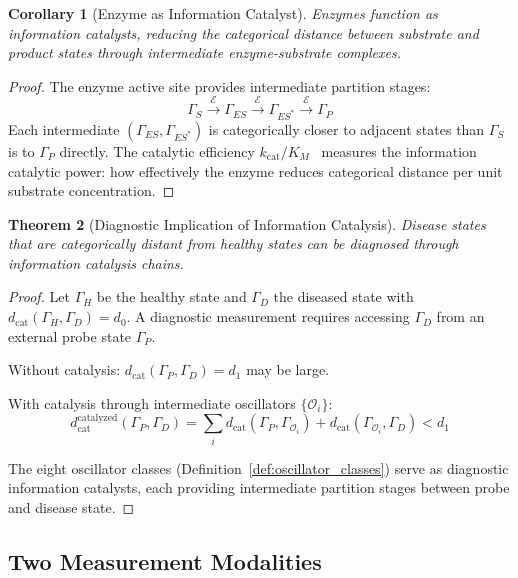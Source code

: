 \documentclass[aps,prd,twocolumn,superscriptaddress,floatfix,nofootinbib]{revtex4-2}
\newtheorem{theorem}{Theorem}[section]
\newtheorem{corollary}[theorem]{Corollary}
\theoremstyle{remark}
\newcommand{\Gstate}{\Gamma}
\newcommand{\dcat}{d_{\mathrm{cat}}}
\begin{document}
\begin{corollary}[Enzyme as Information Catalyst]
\label{cor:enzyme_catalyst}
Enzymes function as information catalysts, reducing the categorical distance between substrate and product states through intermediate enzyme-substrate complexes.
\end{corollary}

\begin{proof}
The enzyme active site provides intermediate partition stages:
\begin{equation}
\Gstate_S \xrightarrow{\mathcal{E}} \Gstate_{ES} \xrightarrow{\mathcal{E}} \Gstate_{ES^*} \xrightarrow{\mathcal{E}} \Gstate_P
\end{equation}
Each intermediate $(\Gstate_{ES}, \Gstate_{ES^*})$ is categorically closer to adjacent states than $\Gstate_S$ is to $\Gstate_P$ directly. The catalytic efficiency $k_{\mathrm{cat}}/K_M$~\cite{fersht1999} measures the information catalytic power: how effectively the enzyme reduces categorical distance per unit substrate concentration.
\end{proof}

\begin{theorem}[Diagnostic Implication of Information Catalysis]
\label{thm:diagnostic_catalysis}
Disease states that are categorically distant from healthy states can be diagnosed through information catalysis chains.
\end{theorem}

\begin{proof}
Let $\Gstate_H$ be the healthy state and $\Gstate_D$ the diseased state with $\dcat(\Gstate_H, \Gstate_D) = d_0$. A diagnostic measurement requires accessing $\Gstate_D$ from an external probe state $\Gstate_P$.

Without catalysis: $\dcat(\Gstate_P, \Gstate_D) = d_1$ may be large.

With catalysis through intermediate oscillators $\{\mathcal{O}_i\}$:
\begin{equation}
\dcat^{\mathrm{catalyzed}}(\Gstate_P, \Gstate_D) = \sum_i \dcat(\Gstate_P, \Gstate_{\mathcal{O}_i}) + \dcat(\Gstate_{\mathcal{O}_i}, \Gstate_D) < d_1
\end{equation}

The eight oscillator classes (Definition~\ref{def:oscillator_classes}) serve as diagnostic information catalysts, each providing intermediate partition stages between probe and disease state.
\end{proof}

\subsection{Two Measurement Modalities}
\end{document}
